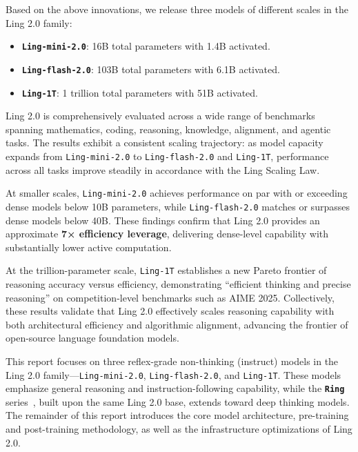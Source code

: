 Based on the above innovations, we release three models of different scales in the Ling 2.0 family:
\begin{itemize}
    \item \texttt{\textbf{Ling-mini-2.0}}: 16B total parameters with 1.4B activated.
    \item \texttt{\textbf{Ling-flash-2.0}}: 103B total parameters with 6.1B activated.
    \item \texttt{\textbf{Ling-1T}}: 1 trillion total parameters with 51B activated.
\end{itemize}


Ling 2.0 is comprehensively evaluated across a wide range of benchmarks spanning mathematics, coding, reasoning, knowledge, alignment, and agentic tasks. The results exhibit a consistent scaling trajectory: as model capacity expands from \texttt{Ling-mini-2.0} to \texttt{Ling-flash-2.0} and \texttt{Ling-1T}, performance across all tasks improve steadily in accordance with the Ling Scaling Law.  

At smaller scales, \texttt{Ling-mini-2.0} achieves performance on par with or exceeding dense models below 10B parameters, while \texttt{Ling-flash-2.0} matches or surpasses dense models below 40B. These findings confirm that Ling 2.0 provides an approximate \textbf{7× efficiency leverage}, delivering dense-level capability with substantially lower active computation.  


At the trillion-parameter scale, \texttt{Ling-1T} establishes a new Pareto frontier of reasoning accuracy versus efficiency, demonstrating “efficient thinking and precise reasoning” on competition-level benchmarks such as AIME 2025. Collectively, these results validate that Ling 2.0 effectively scales reasoning capability with both architectural efficiency and algorithmic alignment, advancing the frontier of open-source language foundation models.

This report focuses on three reflex-grade non-thinking (instruct) models in the Ling 2.0 family—\texttt{Ling-mini-2.0}, \texttt{Ling-flash-2.0}, and \texttt{Ling-1T}. 
These models emphasize general reasoning and instruction-following capability, while the \texttt{\textbf{Ring}} series~\citep{lingteam2025stepevolvesscalingreinforcement}, built upon the same Ling 2.0 base, extends toward deep thinking models.
The remainder of this report introduces the core model architecture, pre-training and post-training methodology, as well as the infrastructure optimizations of Ling 2.0.



